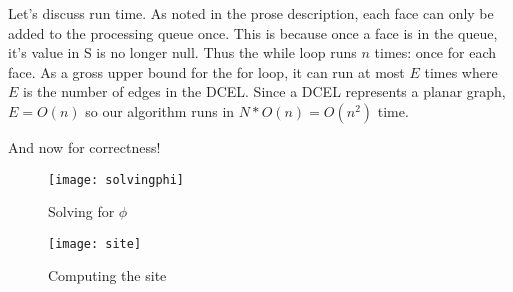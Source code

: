\documentclass[11pt]{article}
\begin{document}
Let's discuss run time.
As noted in the prose description, each face can only be added to the processing queue once.
This is because once a face is in the queue, it's value in S is no longer null.
Thus the while loop runs $n$ times: once for each face.
As a gross upper bound for the for loop, it can run at most $E$ times where $E$ is the number of edges in the DCEL.
Since a DCEL represents a planar graph, $E = O(n)$ so our algorithm runs in $N * O(n) = O(n^2)$ time.

And now for correctness!

\begin{figure}[h]
    \centering
    \texttt{[image: solvingphi]}
    \label{fig:solvingphi}
    \caption{Solving for $\phi$}
\end{figure}

\begin{figure}[h]
    \centering
    \texttt{[image: site]}
    \label{fig:site}
    \caption{Computing the site}
\end{figure}
\end{document}
